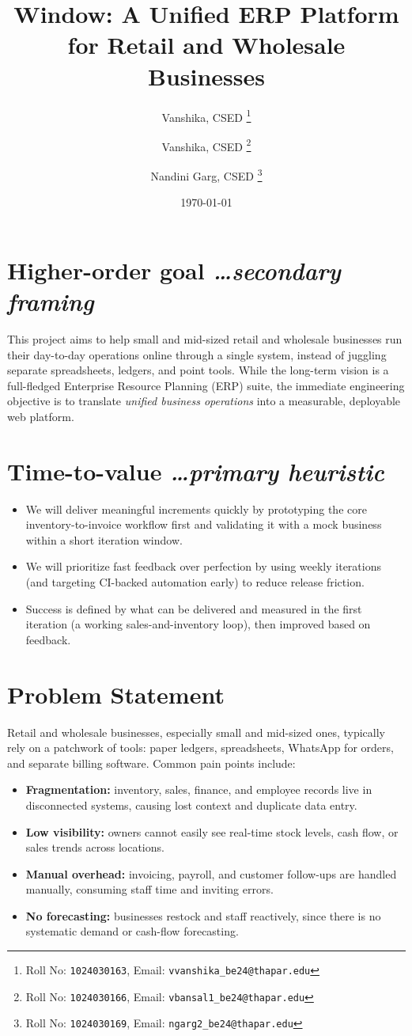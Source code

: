 \documentclass[11pt,a4paper]{article}
\title{Window: A Unified ERP Platform for Retail and Wholesale Businesses}
\author{
  Vanshika, CSED%
  \thanks{Roll No: \texttt{1024030163}, %
    Email: \texttt{vvanshika\_be24@thapar.edu}}
  \and 
  Vanshika, CSED%
  \thanks{Roll No: \texttt{1024030166}, %
    Email: \texttt{vbansal1\_be24@thapar.edu}}
  \and 
  Nandini Garg, CSED%
  \thanks{Roll No: \texttt{1024030169}, %
    Email: \texttt{ngarg2\_be24@thapar.edu}}
}
\date{\today}
\newcommand{\BvrHint}[1]{%
  {\normalfont\normalsize\itshape\hfill #1}}
\begin{document}
\maketitle

\section{Higher-order goal%
  \BvrHint{\ldots secondary framing}}
This project aims to help small and mid-sized retail and
wholesale businesses run their day-to-day operations
online through a single system, instead of juggling
separate spreadsheets, ledgers, and point tools. While the
long-term vision is a full-fledged Enterprise Resource
Planning (ERP) suite, the immediate engineering objective
is to translate \emph{unified business operations} into a
measurable, deployable web platform.

\section{Time-to-value %
\BvrHint{\ldots primary heuristic}}
\begin{itemize}[leftmargin=0.7cm]
    \item We will deliver meaningful increments quickly by prototyping the core inventory-to-invoice workflow first and validating it with a mock business within a short iteration window.
    \item We will prioritize fast feedback over perfection by using weekly iterations (and targeting CI-backed automation early) to reduce release friction.
    \item Success is defined by what can be delivered and measured in the first iteration (a working sales-and-inventory loop), then improved based on feedback.
\end{itemize}

\section{Problem Statement}
Retail and wholesale businesses, especially small and
mid-sized ones, typically rely on a patchwork of tools:
paper ledgers, spreadsheets, WhatsApp for orders, and
separate billing software. Common pain points include:
\begin{itemize}[leftmargin=0.7cm]
    \item \textbf{Fragmentation:} inventory, sales, finance, and employee records live in disconnected systems, causing lost context and duplicate data entry.
    \item \textbf{Low visibility:} owners cannot easily see real-time stock levels, cash flow, or sales trends across locations.
    \item \textbf{Manual overhead:} invoicing, payroll, and customer follow-ups are handled manually, consuming staff time and inviting errors.
    \item \textbf{No forecasting:} businesses restock and staff reactively, since there is no systematic demand or cash-flow forecasting.
\end{itemize}
\end{document}
